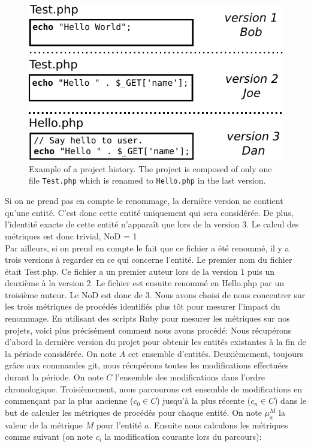 \begin{figure}[t]
	\centering
	\includegraphics[width=0.8\linewidth,keepaspectratio]{data/figures/example.pdf}
	\caption{Example of a project history. The project is composed of only one file \texttt{Test.php} which is renamed to \texttt{Hello.php} in the last version.}
	\label{fig:example}
\end{figure}
Si on ne prend pas en compte le renommage, la dernière version ne contient qu'une entité. C'est donc cette entité uniquement qui sera considérée. De plus, l'identité exacte de cette entité n'apparaît que lors de la version 3. Le calcul des métriques est donc trivial, NoD = 1\\
Par ailleurs, si on prend en compte le fait que ce fichier a été renommé, il y a trois versions à regarder en ce qui concerne l'entité. Le premier nom du fichier était Test.php. Ce fichier a un premier auteur lors de la version 1 puis un deuxième à la version 2. Le fichier est ensuite renommé en Hello.php par un troisième auteur. Le NoD est donc de 3. Nous avons choisi de nous concentrer sur les trois métriques de procédés identifiés plus tôt pour mesurer l'impact du renommage. En utilisant des scripts Ruby pour mesurer les métriques sur nos projets, voici plus précisément comment nous avons procédé: Nous récupérons d'abord la dernière version du projet pour obtenir les entités existantes à la fin de la période considérée. On note $A$ cet ensemble d'entités. Deuxièmement, toujours grâce aux commandes git, nous récupérons toutes les modifications effectuées durant la période. On note $C$ l'ensemble des modifications dans l'ordre chronologique. Troisièmement, nous parcourons cet ensemble de modifications en commençant par la plus ancienne ($c_0 \in C$) jusqu'à la plus récente ($c_n \in C$) dans le but de calculer les métriques de procédés pour chaque entité. On note $\mu_{a}^{M}$ la valeur de la métrique $M$ pour l'entité $a$. Ensuite nous calculons les métriques comme suivant (on note $c_i$ la modification courante lors du parcours):

